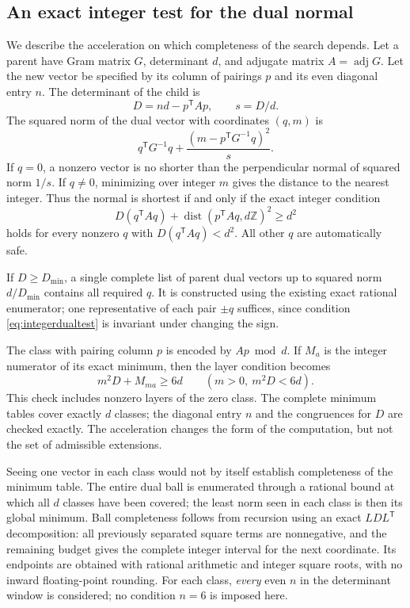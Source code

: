\documentclass[11pt,a4paper]{article}
\theoremstyle{remark}\newtheorem{remark}[theorem]{Remark}
\newcommand{\Z}{\mathbb Z}\newcommand{\R}{\mathbb R}\newcommand{\F}{\mathbb F}
\begin{document}
\subsection{An exact integer test for the dual normal}

We describe the acceleration on which completeness of the search depends. Let a parent have Gram matrix $G$, determinant $d$, and adjugate matrix $A=\operatorname{adj}G$. Let the new vector be specified by its column of pairings $p$ and its even diagonal entry $n$. The determinant of the child is
\[
D=nd-p^{\mathsf T}Ap,\qquad s=D/d.
\]
The squared norm of the dual vector with coordinates $(q,m)$ is
\[
q^{\mathsf T}G^{-1}q+
\frac{(m-p^{\mathsf T}G^{-1}q)^2}{s}.
\]
If $q=0$, a nonzero vector is no shorter than the perpendicular normal of squared norm $1/s$. If $q\ne0$, minimizing over integer $m$ gives the distance to the nearest integer. Thus the normal is shortest if and only if the exact integer condition
\begin{equation}\label{eq:integerdualtest}
D(q^{\mathsf T}Aq)+
\operatorname{dist}(p^{\mathsf T}Aq,d\Z)^2\ge d^2
\end{equation}
holds for every nonzero $q$ with $D(q^{\mathsf T}Aq)<d^2$. All other $q$ are automatically safe.

If $D\ge D_{\min}$, a single complete list of parent dual vectors up to squared norm $d/D_{\min}$ contains all required $q$. It is constructed using the existing exact rational enumerator; one representative of each pair $\pm q$ suffices, since condition \eqref{eq:integerdualtest} is invariant under changing the sign.

The class with pairing column $p$ is encoded by $Ap\bmod d$. If $M_a$ is the integer numerator of its exact minimum, then the layer condition becomes
\begin{equation}\label{eq:integerlayertest}
m^2D+M_{ma}\ge6d
\qquad(m>0,\ m^2D<6d).
\end{equation}
This check includes nonzero layers of the zero class. The complete minimum tables cover exactly $d$ classes; the diagonal entry $n$ and the congruences for $D$ are checked exactly. The acceleration changes the form of the computation, but not the set of admissible extensions.

Seeing one vector in each class would not by itself establish completeness of the minimum table. The entire dual ball is enumerated through a rational bound at which all $d$ classes have been covered; the least norm seen in each class is then its global minimum. Ball completeness follows from recursion using an exact $LDL^{\mathsf T}$ decomposition: all previously separated square terms are nonnegative, and the remaining budget gives the complete integer interval for the next coordinate. Its endpoints are obtained with rational arithmetic and integer square roots, with no inward floating-point rounding. For each class, \emph{every} even $n$ in the determinant window is considered; no condition $n=6$ is imposed here.
\end{document}

